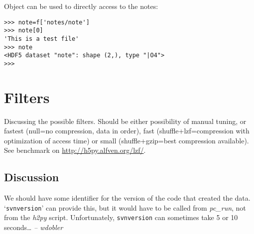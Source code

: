 \documentclass[a4paper,12pt]{article}
\begin{document}
Object can be used to directly access to the notes:
\begin{verbatim}
>>> note=f['notes/note']
>>> note[0]
'This is a test file'
>>> note
<HDF5 dataset "note": shape (2,), type "|O4">
>>> 
\end{verbatim}

\section{Filters}
\label{sec:filters}

Discussing the possible filters. Should be either possibility of
manual tuning, or fastest (null=no compression, data in order), fast
(shuffle+lzf=compression with optimization of access time) or small
(shuffle+gzip=best compression available). See benchmark on
\url{http://h5py.alfven.org/lzf/}. 


\subsection{Discussion}
\label{sec:discussion}

We should have some identifier for the version of the code that created
the data.
`\texttt{svnversion}' can provide this, but it would have to be called
from \emph{pc\_run}, not from the \emph{h2py} script.
Unfortunately, \texttt{svnversion} can sometimes take 5 or 10
seconds\ldots
\emph{\quad-- wdobler}
\end{document}
